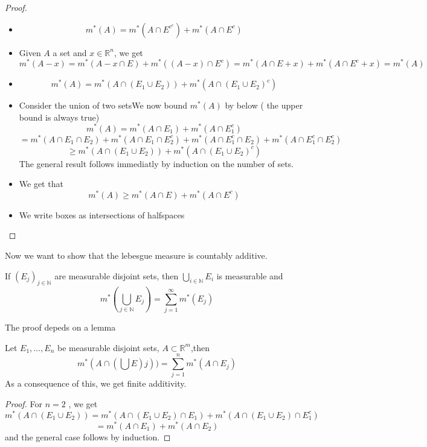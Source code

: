 \documentclass[../main.tex]{subfiles}
\begin{document}
\begin{proof}
	\begin{itemize}

	\item 
		\[ 
		m^{*}( A) =m^{*}( A\cap E^{c^{c}}) + m^{*}( A\cap E^{c}) 
		\]
	\item 
		Given $A$ a set and $x\in \mathbb{R}^n$, we get
		\[ 
		m^{*}( A-x) = m^{*}( A-x \cap E) +m^{*}( ( A-x) \cap E^{c}) = m^{*}( A\cap E+x) + m^{*}( A\cap E^{c}+x) = m^{* }( A) 
		\]

	\item 
		\[ 
		m^{*}( A) =m^{*}( A\cap ( E_1\cup E_2) ) + m^{*}( A\cap ( E_1\cup E_2)^{c} ) 
		\]
		
	\item Consider the union of two setsWe now bound $m^{*}( A) $ by below ( the upper bound is always true) 
		\[ 
		m^{*}( A) = m^{*}( A\cap E_1) +m^{*}( A\cap E_1^{c})
	\]
	\[ 
		=m^{*}( A\cap E_1\cap E_2) +m^{*}( A\cap E_1\cap E_2^{c}) +m^{*}( A\cap E_1^{c}\cap E_2) +m^{*}( A\cap E_1^{c}\cap E_2^{c})
	\]
	\[
		\geq m^{*}( A\cap ( E_1\cup E_2) ) + m^{*}( A\cap ( E_1\cup E_2)^{c} ) 
	\]
		The general result follows immediatly by induction on the number of sets.
	\item We get that
		\[ 
		m^{*}( A) \geq m^{*}( A\cap E) + m^{*}( A\cap E^{c}) 
		\]
		
	\item We write boxes as intersections of halfspaces
		
	\end{itemize}
	
\end{proof}
Now we want to show that the lebesgue measure is countably additive.
\begin{propo}
If $( E_j )_{j\in \mathbb{N}} $ are measurable disjoint sets, then $\bigcup_{i\in \mathbb{N}} E_i$ is measurable and
\[ 
m^{*}( \bigcup_{j\in \mathbb{N}} E_j) = \sum_{j=1}^{ \infty } m^{*}( E_j) 
\]

\end{propo}
The proof depeds on a lemma
\begin{lemma}
Let $E_1,\ldots,E_n$ be measurable disjoint sets, $A \subset \mathbb{R}^m$,then
\[ 
m^{*}( A\cap ( \bigcup E)j) ) = \sum_{j=1}^{ n}m^{*}( A\cap E_j) 
\]
As a consequence of this, we get finite additivity.
\end{lemma}
\begin{proof}
For $n=2$ , we get
\[ 
m^{*}( A\cap ( E_1\cup E_2) ) =m^{*}( A\cap ( E_1\cup E_2) \cap E_1) + m^{*}( A\cap ( E_1\cup E_2) \cap E_1^{c}) 
\]
\[ 
=m^{*}( A\cap E_1) + m^{*}( A\cap E_2) 
\]
and the general case follows by induction.

\end{proof}
\end{document}

